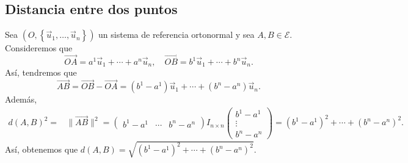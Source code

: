 \subsection*{Distancia entre dos puntos}
\normalfont Sea $\displaystyle \left(O, \left\{ \vec{u}_{1}, \ldots, \vec{u}_{n}\right\} \right) $ un sistema de referencia ortonormal y sea $\displaystyle A,B \in \mathcal{E} $. Consideremos que 
\[\overrightarrow{OA} = a^{1}\vec{u}_{1} + \cdots + a^{n}\vec{u}_{n}, \quad \overrightarrow{OB} = b^{1}\vec{u}_{1} + \cdots + b^{n}\vec{u}_{n} .\]
Así, tendremos que 
\[\overrightarrow{AB} = \overrightarrow{OB}-\overrightarrow{OA} = \left(b^{1}-a^{1}\right)\vec{u}_{1} + \cdots + \left(b^{n}-a^{n}\right)\vec{u}_{n} .\]
Además, 
\[
\begin{split}
	d\left(A,B\right)^{2} = & \|\overrightarrow{AB}\|^{2} = \begin{pmatrix} b^{1}-a^{1} & \cdots & b^{n}-a^{n} \end{pmatrix} I_{n \times n}\begin{pmatrix} b^{1}-a^{1} \\ \vdots \\ b^{n}-a^{n} \end{pmatrix} = \left(b^{1}-a^{1}\right)^{2} + \cdots + \left(b^{n}-a^{n}\right)^{2}.
\end{split}
\]
Así, obtenemos que $\displaystyle d\left(A,B\right) = \sqrt{\left(b^{1}-a^{1}\right)^{2} + \cdots + \left(b^{n}-a^{n}\right)^{2}} $.
